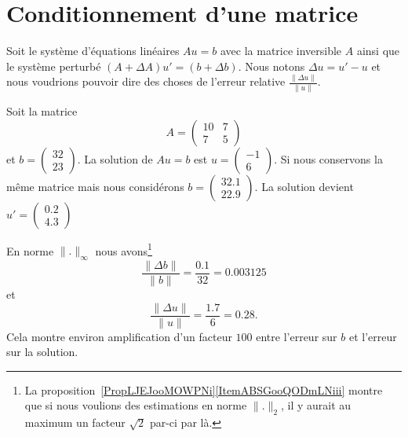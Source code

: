 
\section{Conditionnement d'une matrice}
\label{SECooQGLRooZQzzsA}

Soit le système d'équations linéaires \( Au=b\) avec la matrice inversible \( A\) ainsi que le système perturbé \( (A+\Delta A)u'=(b+\Delta b)\). Nous notons \( \Delta u=u'-u\) et nous voudrions pouvoir dire des choses de l'erreur relative \( \frac{ \| \Delta u \| }{ \| u \| }\).

\begin{example}
	Soit la matrice
	\begin{equation}
		A=\begin{pmatrix}
			10 & 7 \\
			7  & 5
		\end{pmatrix}
	\end{equation}
	et \( b=\begin{pmatrix}
		32 \\
		23
	\end{pmatrix}\). La solution de \( Au=b\) est \( u=\begin{pmatrix}
		-1 \\
		6
	\end{pmatrix}\). Si nous conservons la même matrice mais nous considérons \( b=\begin{pmatrix}
		32.1 \\
		22.9
	\end{pmatrix}\). La solution devient \( u'=\begin{pmatrix}
		0.2 \\
		4.3
	\end{pmatrix}\)

	En norme \( \| . \|_{\infty}\) nous avons\footnote{La proposition~\ref{PropLJEJooMOWPNi}\ref{ItemABSGooQODmLNiii} montre que si nous voulions des estimations en norme \( \| . \|_2\), il y aurait au maximum un facteur \( \sqrt{2}\) par-ci par là.}
	\begin{equation}
		\frac{ \| \Delta b \| }{ \| b \| }=\frac{ 0.1 }{ 32 }=0.003125
	\end{equation}
	et
	\begin{equation}
		\frac{ \| \Delta u \| }{ \| u \| }=\frac{ 1.7 }{ 6 }=0.28.
	\end{equation}
	Cela montre environ amplification d'un facteur \( 100\) entre l'erreur sur \( b\) et l'erreur sur la solution.
\end{example}

